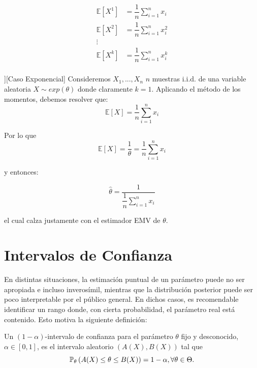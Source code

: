 \begin{align*}
    \mathbb{E}[X^1]&=\dfrac{1}{n}\sum\limits_{i=1}^{n}x_i\\
    \mathbb{E}[X^2]&=\dfrac{1}{n}\sum\limits_{i=1}^{n}x_i^2\\
    \vdots\\
    \mathbb{E}[X^k]&=\dfrac{1}{n}\sum\limits_{i=1}^{n}x_i^k\\
\end{align*}

\begin{example}][Caso Exponencial]
Consideremos $X_1,...,X_n$ $n$ muestras i.i.d. de una variable aleatoria $X\sim exp(\theta)$ donde claramente $k=1$. Aplicando el método de los momentos, debemos resolver que:
\[\mathbb{E}[X]=\dfrac{1}{n}\sum\limits_{i=1}^{n}x_i\]

Por lo que 
\[\mathbb{E}[X]=\dfrac{1}{\theta}=\dfrac{1}{n}\sum\limits_{i=1}^{n}x_i\]

y entonces:

\[\hat{\theta}=\dfrac{1}{\dfrac{1}{n}\sum\limits_{i=1}^{n}x_i}\]

el cual calza justamente con el estimador EMV de $\theta$. 
\end{example}


\section{Intervalos de Confianza} 

En distintas situaciones, la estimación puntual de un parámetro puede no ser apropiada e incluso inverosímil, mientras que la distribución posterior puede ser poco interpretable por el público general. En dichos casos, es recomendable identificar un rango donde, con cierta probabilidad, el parámetro real está contenido. Esto motiva la siguiente definición: 

\begin{definition}
\label{def:conf_inter} Un $(1-\alpha)$-intervalo de confianza para el parámetro $\theta$ fijo y desconocido, $\alpha\in[0,1]$, es el intervalo aleatorio $(A(X),B(X))$ tal que 
\begin{equation}
	\label{eq:conf_inter}
	\mathbb{P}_\theta \left(A(X)\leq\theta\leq B(X)\right) = 1-\alpha, \forall \theta\in\Theta.
\end{equation}
\end{definition}

